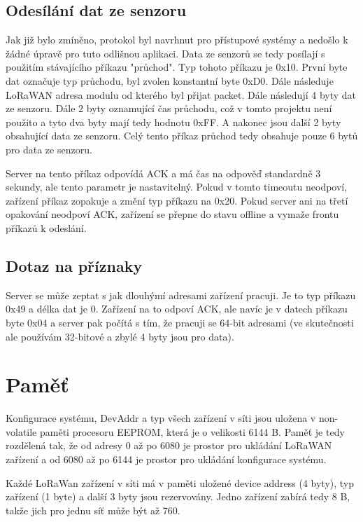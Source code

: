 \subsection{Odesílání dat ze senzoru}
Jak již bylo zmíněno, protokol byl navrhnut pro přístupové systémy a nedošlo k žádné úpravě pro tuto odlišnou aplikaci. Data ze senzorů se tedy posílají s použitím stávajícího příkazu "průchod".
Typ tohoto příkazu je 0x10. První byte dat označuje typ průchodu, byl zvolen konstantní byte 0xD0.
Dále následuje LoRaWAN adresa modulu od kterého byl přijat packet. Dále následují 4 byty dat ze senzoru. Dále 2 byty oznamující čas průchodu, což v tomto projektu není použito a tyto dva byty mají tedy hodnotu 0xFF. A nakonec jsou další 2 byty obsahující data ze senzoru.
Celý tento příkaz průchod tedy obsahuje pouze 6 bytů pro data ze senzoru.

Server na tento příkaz odpovídá ACK a má čas na odpověď standardně 3 sekundy, ale tento parametr je nastavitelný. Pokud v tomto timeoutu neodpoví, zařízení  příkaz zopakuje a změní typ příkazu na 0x20. Pokud server ani na třetí opakování neodpoví ACK, zařízení se přepne do stavu offline a vymaže frontu příkazů k odeslání.


\subsection{Dotaz na příznaky}
Server se může zeptat s jak dlouhýmí adresami zařízení pracuji. Je to typ příkazu 0x49 a délka dat je 0. Zařízení na to odpoví ACK, ale navíc je v datech příkazu byte 0x04 a server pak počítá s tím, že pracuji se 64-bit adresami (ve skutečnosti ale používám 32-bitové a zbylé 4 byty jsou pro data).


\section{Paměť}
Konfigurace systému, DevAddr a typ všech zařízení v síti jsou uložena v non-volatile paměti procesoru EEPROM, která je o velikosti 6144 B. 
Paměť je tedy rozdělená tak, že od adresy 0 až po 6080 je prostor pro ukládání LoRaWAN zařízení a od 6080 až po 6144 je prostor pro ukládání konfigurace systému.

Každé LoRaWan zařízení v síti má v paměti uložené device address (4 byty), typ zařízení (1 byte) a další 3 byty jsou rezervovány. 
Jedno zařízení zabírá tedy 8 B, takže jich pro jednu síť může být až 760.


